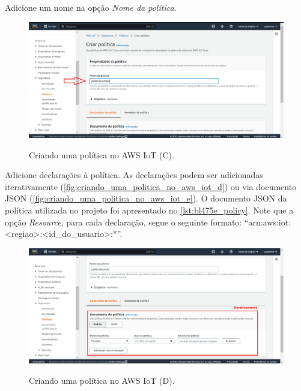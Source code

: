 Adicione um nome na opção \textit{Nome da política}.

\begin{figure}[H]
    \centering
    \caption{Criando uma política no AWS IoT (C).}
    \includegraphics[scale=0.472]{Imagens/criando_uma_politica_no_aws_iot_2.png}
    \label{fig:criando_uma_politica_no_aws_iot_c}
\end{figure}

Adicione declarações à política. As declarações podem ser adicionadas iterativamente (\autoref{fig:criando_uma_politica_no_aws_iot_d}) ou via documento JSON (\autoref{fig:criando_uma_politica_no_aws_iot_e}). O documento JSON da política utilizada no projeto foi apresentado no \autoref{lst:bl475e_policy}. Note que a opção \textit{Resource}, para cada declaração, segue o seguinte formato: ``arn:aws:iot: \textless regiao\textgreater:\textless id\_do\_usuario\textgreater:*''.

\begin{figure}[H]
    \centering
    \caption{Criando uma política no AWS IoT (D).}
    \includegraphics[scale=0.472]{Imagens/criando_uma_politica_no_aws_iot_3.png}
    \label{fig:criando_uma_politica_no_aws_iot_d}
\end{figure}

